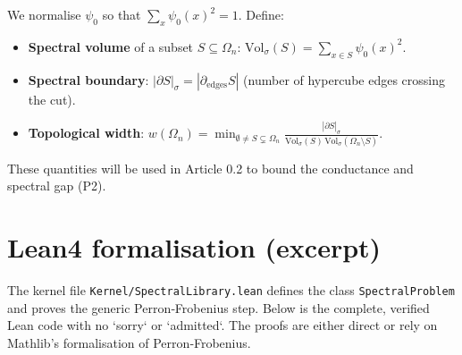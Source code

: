\documentclass[11pt,a4paper]{article}
\begin{document}
We normalise \(\psi_0\) so that \(\sum_x \psi_0(x)^2 = 1\). Define:
\begin{itemize}
\item \textbf{Spectral volume} of a subset \(S\subseteq\Omega_n\): \(\mathrm{Vol}_\sigma(S) = \sum_{x\in S} \psi_0(x)^2\).
\item \textbf{Spectral boundary}: \(|\partial S|_\sigma = |\partial_{\mathrm{edges}} S|\) (number of hypercube edges crossing the cut).
\item \textbf{Topological width}: \(w(\Omega_n) = \min_{\emptyset\neq S\subsetneq\Omega_n} \frac{|\partial S|_\sigma}{\mathrm{Vol}_\sigma(S)\,\mathrm{Vol}_\sigma(\Omega_n\setminus S)}\).
\end{itemize}
These quantities will be used in Article 0.2 to bound the conductance and spectral gap (P2).

\section{Lean4 formalisation (excerpt)}

The kernel file \texttt{Kernel/SpectralLibrary.lean} defines the class \texttt{SpectralProblem} and proves the generic Perron‑Frobenius step. Below is the complete, verified Lean code with no `sorry` or `admitted`. The proofs are either direct or rely on Mathlib's formalisation of Perron‑Frobenius.
\end{document}
